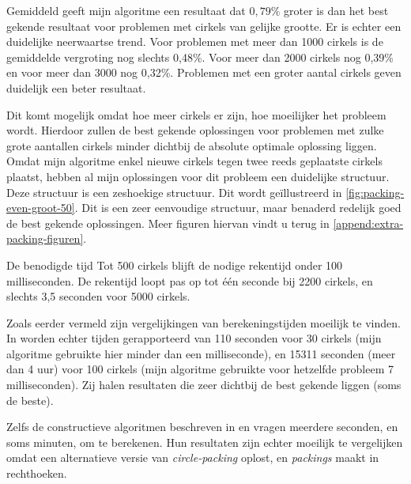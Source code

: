 \documentclass[12pt,a4paper,oneside]{book}
\begin{document}
{Gemiddeld geeft mijn algoritme een resultaat dat $0,79\%$ groter is dan het best gekende resultaat voor problemen met cirkels van gelijke grootte.
Er is echter een duidelijke neerwaartse trend.
Voor problemen met meer dan 1000 cirkels is de gemiddelde vergroting nog slechts 0,48\%.
Voor meer dan 2000 cirkels nog 0,39\% en voor meer dan 3000 nog 0,32\%.
Problemen met een groter aantal cirkels geven duidelijk een beter resultaat.

Dit komt mogelijk omdat hoe meer cirkels er zijn, hoe moeilijker het probleem wordt.
Hierdoor zullen de best gekende oplossingen voor problemen met zulke grote aantallen cirkels minder dichtbij de absolute optimale oplossing liggen.
Omdat mijn algoritme enkel nieuwe cirkels tegen twee reeds geplaatste cirkels plaatst, hebben al mijn oplossingen voor dit probleem een duidelijke structuur.
Deze structuur is een zeshoekige structuur.
Dit wordt geïllustreerd in \autoref{fig:packing-even-groot-50}.
Dit is een zeer eenvoudige structuur, maar benaderd redelijk goed de best gekende oplossingen.
Meer figuren hiervan vindt u terug in \autoref{append:extra-packing-figuren}.

De benodigde tijd %
Tot 500 cirkels blijft de nodige rekentijd onder 100 milliseconden.
De rekentijd loopt pas op tot één seconde bij 2200 cirkels, en slechts 3,5 seconden voor 5000 cirkels.

Zoals eerder vermeld zijn vergelijkingen van berekeningstijden moeilijk te vinden.
In \cite{grosso2010} worden echter tijden gerapporteerd van 110 seconden voor 30 cirkels (mijn algoritme gebruikte hier minder dan een milliseconde), en 15311 seconden (meer dan 4 uur) voor 100 cirkels (mijn algoritme gebruikte voor hetzelfde probleem 7 milliseconden).
Zij halen resultaten die zeer dichtbij de best gekende liggen (soms de beste).

Zelfs de constructieve algoritmen beschreven in \cite{akeb2006basic} en \cite{hifi2004approximate} vragen meerdere seconden, en soms minuten, om te berekenen.
Hun resultaten zijn echter moeilijk te vergelijken omdat \cite{akeb2006basic} een alternatieve versie van \textit{circle-packing} oplost, en \cite{hifi2004approximate} \textit{packings} maakt in rechthoeken.

}
\end{document}
